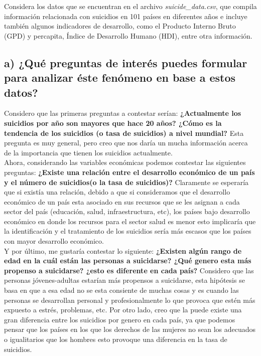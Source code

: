 \documentclass[paper=letter, fontsize=11pt]{scrartcl}
\numberwithin{equation}{section} %
\numberwithin{figure}{section} %
\numberwithin{table}{section} %
\begin{document}
Considera los datos que se encuentran en el archivo \textit{suicide\_data.csv}, que compila información relacionada con suicidios en 101 países en diferentes años e incluye también algunos indicadores de desarrollo, como el Producto Interno Bruto (GPD) y percapita, Índice de Desarrollo Humano (HDI), entre otra información.

\subsection{a) ¿Qué preguntas de interés puedes formular para analizar éste fenómeno en base a estos datos?}

Considero que las primeras preguntas a contestar serían: \textbf{¿Actualmente los suicidios por año son mayores que hace 20 años? ¿Cómo es la tendencia de los suicidios (o tasa de suicidios) a  nivel mundial?} Esta pregunta es muy general, pero creo que nos daría un mucha información acerca de la importancia que tienen los suicidios actualmente.\\

Ahora, considerando las variables económicas podemos contestar las siguientes preguntas: \textbf{¿Existe una relación entre el desarrollo económico de un país y el número de suicidios(o la tasa de suicidios)?} Claramente se esperaría que si existía una relación, debido a que si consideramos que el desarrollo económico de un país esta asociado en sus recursos que se les asignan a cada sector del país (educación, salud, infraestructura, etc), los países bajo desarrollo económico en donde los recursos para el sector salud es menor esto implicaría que la identificación y el tratamiento de los suicidios sería más escasos que los países con mayor desarrollo económico.\\ 

Y por último, me gustaría contestar lo siguiente: \textbf{¿Existen algún rango de edad en la cuál están las personas a suicidarse? ¿Qué genero esta más propenso a suicidarse? ¿esto es diferente en cada país?} Considero que las personas jóvenes-adultas estarían más propensos a suicidarse, esta hipótesis se basa en que a esa edad no se esta consiente de muchas cosas y es cuando las personas se desarrollan personal y profesionalmente lo que provoca que estén más expuesto a estrés, problemas, etc. Por otro lado, creo que la puede existe una gran diferencia entre los suicidios por genero en cada país, ya que podemos pensar que los países en los que los derechos de las mujeres no sean los adecuados o igualitarios que los hombres esto provoque una diferencia en la tasa de suicidios.\\
\end{document}
